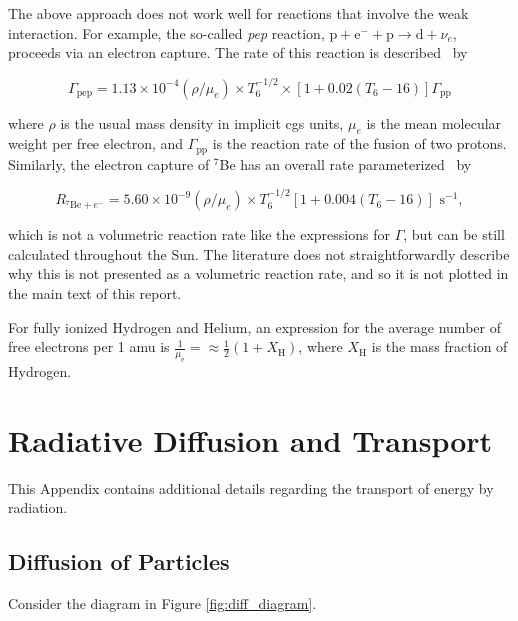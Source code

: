 \documentclass[12pt]{article}
\begin{document}
The above approach does not work well for reactions that involve the weak interaction. For example, the so-called \textit{pep} reaction, $\mathrm{p} + \mathrm{e}^{-} + \mathrm{p} \rightarrow \mathrm{d} + \nu_e$, proceeds via an electron capture. The rate of this reaction is described~\cite{Acharya2024} by

\begin{equation}
    \Gamma_\mathrm{pep} = 1.13 \times 10^{-4} (\rho/\mu_e) \times T_6^{-1/2} \times [1 + 0.02(T_6 - 16)] \Gamma_\mathrm{pp}
\end{equation}

where $\rho$ is the usual mass density in implicit cgs units, $\mu_e$ is the mean molecular weight per free electron, and $\Gamma_\mathrm{pp}$ is the reaction rate of the fusion of two protons. Similarly, the electron capture of $^7$Be has an overall rate parameterized~\cite{Acharya2024} by

\begin{equation}
    R_{^7\mathrm{Be} + e^{-}} = 5.60 \times 10^{-9} (\rho/\mu_e) \times T_6^{-1/2} [1 + 0.004(T_6 - 16)] \text{ s}^{-1},
\end{equation}

which is not a volumetric reaction rate like the expressions for $\Gamma$, but can be still calculated throughout the Sun. The literature does not straightforwardly describe why this is not presented as a volumetric reaction rate, and so it is not plotted in the main text of this report.

For fully ionized Hydrogen and Helium, an expression for the average number of free electrons per 1 amu is $\frac{1}{\mu_\mathrm{e}} = \approx \frac{1}{2}(1 + X_\mathrm{H})$, where $X_\mathrm{H}$ is the mass fraction of Hydrogen.

\pagebreak

\setcounter{equation}{0}
\section{Radiative Diffusion and Transport} \label{ap:rad_diff}
This Appendix contains additional details regarding the transport of energy by radiation.
\subsection{Diffusion of Particles}
Consider the diagram in Figure \ref{fig:diff_diagram}.
\end{document}

